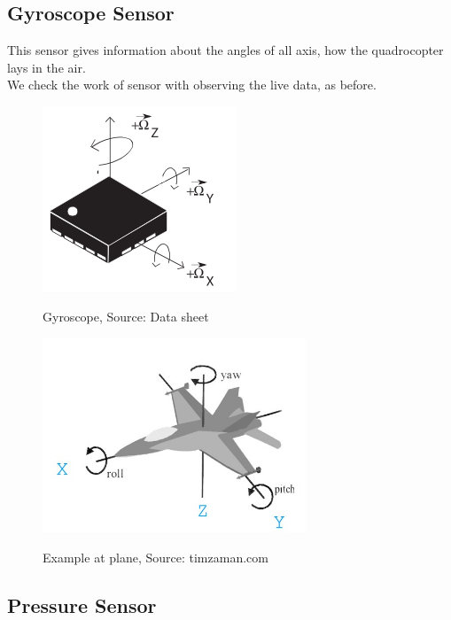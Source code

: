 \subsection{Gyroscope Sensor}

This sensor gives information about the angles of all axis, how the quadrocopter lays in the air.\\
We check the work of sensor with observing the live data, as before.

\begin{figure}[H]
	\centering
		\includegraphics{fig/ch-sensor_testing_concept/Gyroscope.png}%
	\label{fig:IMU_Gyro}
	\caption{Gyroscope, Source: Data sheet}
\end{figure}


\begin{figure}[H]
	\centering
		\includegraphics[width=0.7\textwidth]{fig/ch-sensor_testing_concept/timzaman.jpg}%
	\label{fig:IMU_Gyro}
	\caption{Example at plane, Source: timzaman.com}
\end{figure}



\subsection{Pressure Sensor}

